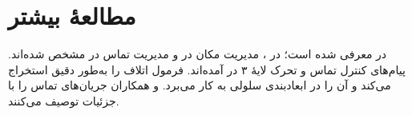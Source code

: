 \documentclass[11pt,a4paper]{article}
\begin{document}
\section{مطالعهٔ بیشتر}
 در \cite{ituq700} معرفی شده است؛  در \cite{ts29002}، مدیریت مکان در
\cite{ts23012} و مدیریت تماس در \cite{ts23018} مشخص شده‌اند. پیام‌های کنترل تماس و تحرک لایهٔ ۳
در \cite{ts24008} آمده‌اند.  \cite{kleinrock1975queueing} فرمول اتلاف را به‌طور دقیق
استخراج می‌کند و  \cite{rappaport2002wireless} آن را در ابعادبندی سلولی به کار
می‌برد.  و همکاران \cite{eberspaecher2009gsm} جریان‌های تماس  را با
جزئیات توصیف می‌کنند.

\begin{latin}
\printbibliography[heading=subbibliography,title={References}]
\end{latin}
\end{document}
